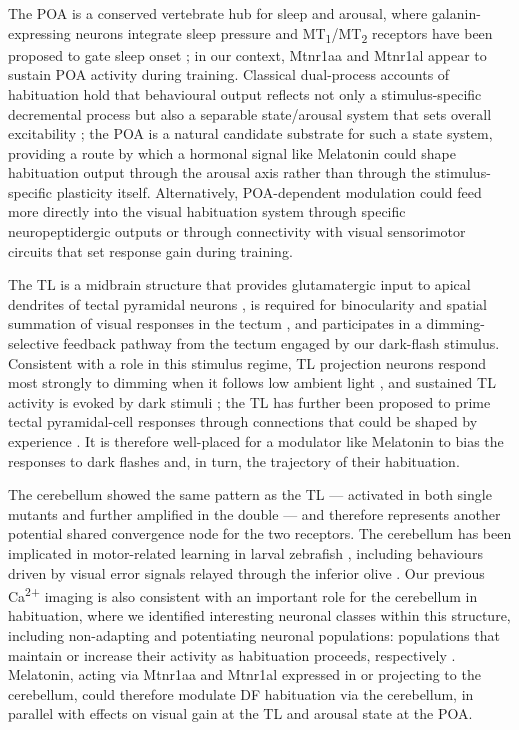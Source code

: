 \documentclass[9.5pt]{RandlettLab_elife}            %
\begin{document}
The POA is a conserved vertebrate hub for sleep and arousal, where galanin-expressing neurons integrate sleep pressure \citep{Reichert2019-sz} and MT\textsubscript{1}/MT\textsubscript{2} receptors have been proposed to gate sleep onset \citep{Ng2017, Klosen2019}; in our context, Mtnr1aa and Mtnr1al appear to sustain POA activity during training.
Classical dual-process accounts of habituation hold that behavioural output reflects not only a stimulus-specific decremental process but also a separable state/arousal system that sets overall excitability \citep{Groves1970}; the POA is a natural candidate substrate for such a state system, providing a route by which a hormonal signal like Melatonin could shape habituation output through the arousal axis rather than through the stimulus-specific plasticity itself.
Alternatively, POA-dependent modulation could feed more directly into the visual habituation system through specific neuropeptidergic outputs or through connectivity with visual sensorimotor circuits that set response gain during training.

The TL is a midbrain structure that provides glutamatergic input to apical dendrites of tectal pyramidal neurons \citep{Folgueira2020-tl, DeMarco2021}, is required for binocularity and spatial summation of visual responses in the tectum \citep{Tesmer2022}, and participates in a dimming-selective feedback pathway from the tectum \citep{Robles2021} engaged by our dark-flash stimulus.
Consistent with a role in this stimulus regime, TL projection neurons respond most strongly to dimming when it follows low ambient light \citep{Robles2021}, and sustained TL activity is evoked by dark stimuli \citep{Northmore2017}; the TL has further been proposed to prime tectal pyramidal-cell responses through connections that could be shaped by experience \citep{Northmore2017}.
It is therefore well-placed for a modulator like Melatonin to bias the responses to dark flashes and, in turn, the trajectory of their habituation.

The cerebellum showed the same pattern as the TL — activated in both single mutants and further amplified in the double — and therefore represents another potential shared convergence node for the two receptors.
The cerebellum has been implicated in motor-related learning in larval zebrafish \citep{Markov2021, Lin2020}, including behaviours driven by visual error signals relayed through the inferior olive \citep{Ahrens2012}. Our previous Ca\textsuperscript{2+} imaging is also consistent with an important role for the cerebellum in habituation, where we identified interesting neuronal classes within this structure, including non-adapting and potentiating neuronal populations: populations that maintain or increase their activity as habituation proceeds, respectively \citep{Lamire2023-he}. 
Melatonin, acting via Mtnr1aa and Mtnr1al expressed in or projecting to the cerebellum, could therefore modulate DF habituation via the cerebellum, in parallel with effects on visual gain at the TL and arousal state at the POA.
\end{document}
